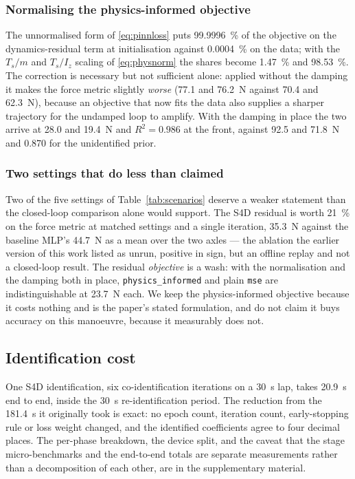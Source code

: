 \subsubsection{Normalising the physics-informed objective}
The unnormalised form of \eqref{eq:pinnloss} puts \SI{99.9996}{\percent} of the
objective on the dynamics-residual term at initialisation against
\SI{0.0004}{\percent} on the data; with the $T_{s}/m$ and $T_{s}/I_{z}$ scaling
of \eqref{eq:physnorm} the shares become \SI{1.47}{\percent} and
\SI{98.53}{\percent}. The correction is necessary but not sufficient alone:
applied without the damping it makes the force metric slightly \emph{worse}
(\num{77.1} and \SI{76.2}{\newton} against \num{70.4} and \SI{62.3}{\newton}),
because an objective that now fits the data also supplies a sharper trajectory
for the undamped loop to amplify. With the damping in place the two arrive at
\num{28.0} and \SI{19.4}{\newton} and $R^{2}=\num{0.986}$ at the front, against
\num{92.5} and \SI{71.8}{\newton} and \num{0.870} for the unidentified prior.

\subsubsection{Two settings that do less than claimed}
Two of the five settings of Table~\ref{tab:scenarios} deserve a weaker
statement than the closed-loop comparison alone would support. The S4D residual
is worth \SI{21}{\percent} on the force metric at matched settings and a single
iteration, \SI{35.3}{\newton} against the baseline MLP's \SI{44.7}{\newton} as
a mean over the two axles --- the ablation the earlier version of this work
listed as unrun, positive in sign, but an offline replay and not a closed-loop
result. The residual \emph{objective} is a wash: with the normalisation and the
damping both in place, \texttt{physics\_informed} and plain \texttt{mse} are
indistinguishable at \SI{23.7}{\newton} each. We keep the physics-informed
objective because it costs nothing and is the paper's stated formulation, and
do not claim it buys accuracy on this manoeuvre, because it measurably does
not.

\subsection{Identification cost}
\label{subsec:runtime}

One S4D identification, six co-identification iterations on a \SI{30}{\second}
lap, takes \SI{20.9}{\second} end to end, inside the \SI{30}{\second}
re-identification period. The reduction from the \SI{181.4}{\second} it
originally took is exact: no epoch count, iteration count, early-stopping rule
or loss weight changed, and the identified coefficients agree to four decimal
places. The per-phase breakdown, the device split, and the caveat that the
stage micro-benchmarks and the end-to-end totals are separate measurements
rather than a decomposition of each other, are in the supplementary material.
